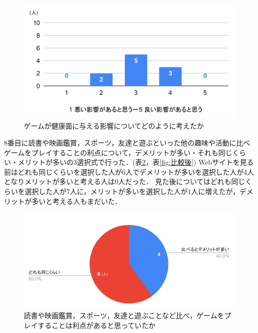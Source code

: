 \documentclass[12pt,a4j,titlepage]{ltjsarticle}
\begin{document}
\begin{figure}[H]
 \begin{center}
  \includegraphics[keepaspectratio, scale=0.5]{健康後.pdf}
 \end{center}
 \caption{ゲームが健康面に与える影響についてどのように考えたか}
 \label{fig:健康後}
\end{figure}

8番目に読書や映画鑑賞，スポーツ，友達と遊ぶといった他の趣味や活動に比べゲームをプレイすることの利点について，デメリットが多い・それも同じくらい・メリットが多いの3選択式で行った．(表\ref{fig:比較前}，表\ref{fig:比較後})
Webサイトを見る前はどれも同じくらいを選択した人が6人でデメリットが多いを選択した人が4人となりメリットが多いと考える人は0人だった．
見た後についてはどれも同じくらいを選択した人が7人に，メリットが多いを選択した人が1人に増えたが，デメリットが多いと考える人もまだいた．

\begin{figure}[H]
 \begin{center}
  \includegraphics[keepaspectratio, scale=0.5]{比較前.pdf}
 \end{center}
 \caption{読書や映画鑑賞，スポーツ，友達と遊ぶことなど比べ，ゲームをプレイすることは利点があると思っていたか}
 \label{fig:比較前}
\end{figure}
\end{document}
